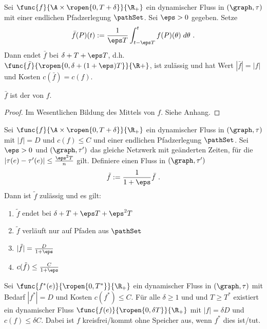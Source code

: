 \begin{lemma}\label{lem:flow_avg}
    Sei $\func{f}{\A \times \ropen{0, T + \delta}}{\R_+}$ ein dynamischer Fluss in
    $(\graph, \tau)$ mit einer endlichen Pfadzerlegung $\pathSet$.
    Sei $\eps > 0$ gegeben. Setze
    \[
    \bar{f}(P)(t) := \frac{1}{\eps T}
                            \int_{t - \eps T}^{t} f(P)(\theta) \; d\theta \text{ .}
    \]
    Dann endet $\bar{f}$ bei $\delta + T + \eps T$,
    d.h. $\func{\bar{f}}{\ropen{0, \delta + (1+\eps)T}}{\R+}$, ist zulässig und hat Wert
    $|\bar{f}| = |f|$ und Kosten $c(\bar{f}) = c(f)$.

    $\bar{f}$ ist der  von $f$.

    \begin{proof}
        Im Wesentlichen Bildung des Mittels von $f$. Siehe Anhang.
    \end{proof}
\end{lemma}

\begin{theorem}\label{theo:slow_flow}
    Sei $\func{f}{\A \times \ropen{0, T + \delta}}{\R_+}$ ein dynamischer Fluss in
    $(\graph, \tau)$ mit $|f| = D$ und $c(f) \leq C$ und einer endlichen
    Pfadzerlegung $\pathSet$. Sei $\eps > 0$ und $(\graph, \tau')$ das
    gleiche Netzwerk mit geänderten Zeiten, für die
    $\left|\tau(e) - \tau'(e)\right| \leq \frac{\eps^2T}{n}$ gilt. Definiere
    einen Fluss in $(\graph, \tau')$
    \[
    \tilde{f} := \frac{1}{1+\eps} \bar{f} \text{ .}
    \]
    Dann ist $\tilde{f}$ zulässig und es gilt:
    \begin{enumerate}
        \item $\tilde{f}$ endet bei $\delta + T + \eps T + \eps^2 T$
        \item $\tilde{f}$ verläuft nur auf Pfaden aus $\pathSet$
        \item $|\tilde{f}| = \frac{D}{1 + \eps}$
        \item $c(\tilde{f}) \leq \frac{C}{1 + \eps}$
    \end{enumerate}
\end{theorem}

\begin{lemma}\label{lem:relaxed_flow}
    Sei $\func{f^*(e)}{\ropen{0,T^*}}{\R_+}$ ein dynamischer Fluss in $(\graph, \tau)$
    mit Bedarf $|f^*| = D$ und Kosten $c(f^*) \leq C$. Für alle $\delta \geq 1$ und
    und $T \geq T^*$ existiert ein dynamischer Fluss
    $\func{f(e)}{\ropen{0, \delta T}}{\R_+}$ mit $|f| = \delta D$ und
    $c(f) \leq \delta C$. Dabei ist $f$ kreisfrei/kommt ohne Speicher aus, wenn $f^*$
    dies ist/tut.
\end{lemma}

